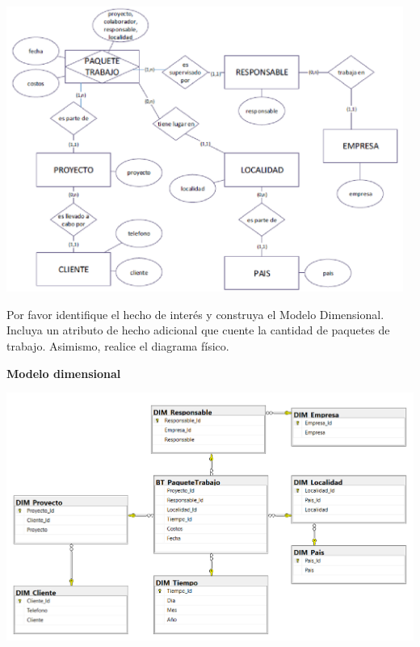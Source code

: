 \documentclass[12pt,letterpaper]{article}
\begin{document}
\begin{center}
    \includegraphics[width=13cm]{./img/img3.png}
\end{center}

Por favor identifique el hecho de interés y construya el Modelo Dimensional. Incluya un atributo de hecho adicional que cuente la cantidad de paquetes de trabajo. Asimismo, realice el diagrama físico.

\textbf{Modelo dimensional}
\begin{center}
    \includegraphics[width=16cm]{./img/img7.png}
\end{center}
\end{document}
